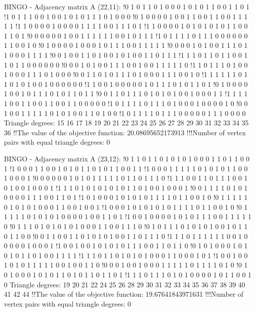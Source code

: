 BINGO - Adjacency matrix A (22,11):
!0 1 0 1 1 0 1 0 0 0 1 0 1 0 1 1 0 0 1 1 0 1
!1 0 1 1 1 0 0 1 0 0 1 0 1 0 1 1 1 0 1 0 0 0
!0 1 0 0 0 0 1 0 0 1 1 0 0 1 1 0 0 1 1 1 1 1
!1 1 0 0 0 0 1 0 0 0 0 1 1 1 1 0 0 1 1 1 0 1
!1 1 0 0 0 0 1 0 1 0 1 0 1 0 1 1 0 0 1 1 0 1
!0 0 0 0 0 0 1 0 0 1 1 1 1 1 1 0 0 1 0 1 1 1
!1 0 1 1 1 1 0 1 1 1 0 0 0 0 0 0 1 1 0 0 1 0
!0 1 0 0 0 0 1 0 0 0 1 0 1 1 1 0 0 1 1 1 1 1
!0 0 0 0 1 0 1 0 0 1 1 1 0 1 1 0 0 0 1 1 1 1
!0 0 1 0 0 1 1 0 1 0 0 1 0 1 0 0 1 1 0 1 1 1
!1 1 1 0 1 1 0 1 1 0 0 1 1 0 1 1 0 0 0 0 0 0
!0 0 0 1 0 1 0 0 1 1 1 0 0 1 0 0 1 1 1 1 1 0
!1 1 0 1 1 1 0 1 0 0 1 0 0 0 1 1 1 0 1 0 0 0
!0 0 1 1 0 1 0 1 1 1 0 1 0 0 0 1 1 1 0 0 1 0
!1 1 1 1 1 1 0 1 1 0 1 0 1 0 0 1 0 0 0 0 0 0
!1 1 0 0 1 0 0 0 0 0 1 0 1 1 1 0 1 0 1 1 0 1
!0 1 0 0 0 0 1 0 0 1 0 1 1 1 0 1 0 1 1 0 1 1
!0 0 1 1 0 1 1 1 0 1 0 1 0 1 0 0 1 0 0 0 1 1
!1 1 1 1 1 0 0 1 1 0 0 1 1 0 0 1 1 0 0 0 0 0
!1 0 1 1 1 1 0 1 1 1 0 1 0 0 0 1 0 0 0 0 1 0
!0 0 1 0 0 1 1 1 1 1 0 1 0 1 0 0 1 1 0 1 0 0
!1 0 1 1 1 1 0 1 1 1 0 0 0 0 0 1 1 1 0 0 0 0
Triangle degrees:
15 16 17 18 19 20 21 22 23 24 25 26 27 28 29 30 31 32 33 34 35 36
!!The value of the objective function: 20.08695652173913
!!!Number of vertex pairs with equal triangle degrees: 0


BINGO - Adjacency matrix A (23,12):
!0 1 1 0 1 1 0 1 0 1 0 1 0 0 0 1 1 0 1 1 0 0 1
!1 0 0 0 1 1 0 0 1 0 1 0 1 1 0 1 0 1 1 0 0 1 1
!1 0 0 0 1 1 1 1 1 0 1 0 1 0 1 1 0 0 1 0 0 0 1
!0 0 0 0 0 0 1 0 1 0 1 1 1 1 1 0 1 1 0 1 1 1 0
!1 1 1 0 0 1 1 0 1 1 1 0 0 1 0 1 0 0 1 0 0 0 1
!1 1 1 0 1 0 1 0 1 0 1 0 1 1 0 1 0 0 1 0 0 0 1
!0 0 1 1 1 1 0 1 0 1 0 0 0 0 1 1 1 0 0 1 1 0 1
!1 0 1 0 0 0 1 0 1 0 1 0 1 1 1 1 0 1 1 0 0 1 0
!0 1 1 1 1 1 0 1 0 1 0 1 0 0 0 1 1 0 0 1 0 0 1
!1 0 0 0 1 0 1 0 1 0 1 0 1 1 1 1 0 1 1 0 0 1 0
!0 1 1 1 1 1 0 1 0 1 0 1 0 0 0 0 1 0 0 1 1 0 1
!1 0 0 1 0 0 0 0 1 0 1 0 1 1 1 0 0 1 1 1 1 1 0
!0 1 1 1 0 1 0 1 0 1 0 1 0 0 0 1 1 0 0 1 1 1 0
!0 1 0 1 1 1 0 1 0 1 0 1 0 0 1 0 1 1 0 1 1 0 0
!0 0 1 1 0 0 1 1 0 1 0 1 0 1 0 0 1 1 0 1 1 1 0
!1 1 1 0 1 1 1 1 1 1 0 0 1 0 0 0 0 0 1 0 0 0 1
!1 0 0 1 0 0 1 0 1 0 1 0 1 1 1 0 0 1 1 0 1 1 0
!0 1 0 1 0 0 0 1 0 1 0 1 0 1 1 0 1 0 0 1 1 1 1
!1 1 1 0 1 1 0 1 0 1 0 1 0 0 0 1 1 0 0 0 1 0 1
!1 0 0 1 0 0 1 0 1 0 1 1 1 1 1 0 0 1 0 0 1 1 0
!0 0 0 1 0 0 1 0 0 0 1 1 1 1 1 0 1 1 1 1 0 1 0
!0 1 0 1 0 0 0 1 0 1 0 1 1 0 1 0 1 1 0 1 1 0 1
!1 1 1 0 1 1 1 0 1 0 1 0 0 0 0 1 0 1 1 0 0 1 0
Triangle degrees:
19 20 21 22 24 25 26 28 29 30 31 32 33 34 35 36 37 38 39 40 41 42 44
!!The value of the objective function: 19.67641843971631
!!!Number of vertex pairs with equal triangle degrees: 0


